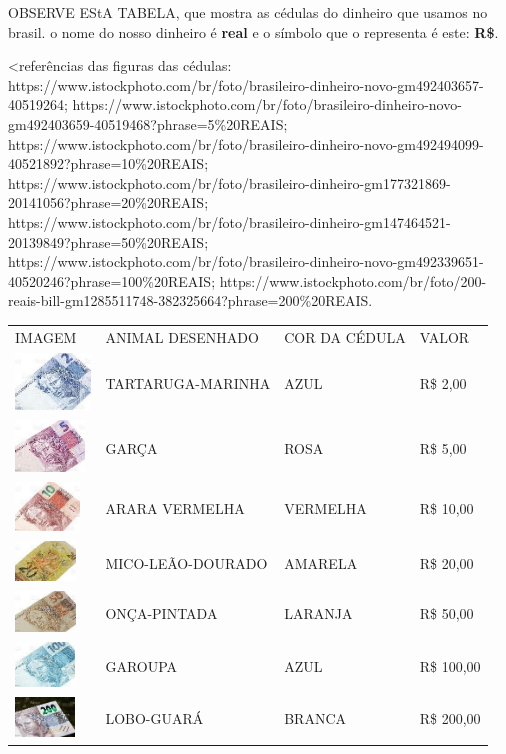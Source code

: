 OBSERVE EStA TABELA, que
mostra as cédulas do dinheiro que usamos no brasil. o nome do nosso
dinheiro é \textbf{real} e o símbolo que o representa é este: \textbf{R\$}.

\textless{}referências das figuras das cédulas:
https://www.istockphoto.com/br/foto/brasileiro-dinheiro-novo-gm492403657-40519264;
https://www.istockphoto.com/br/foto/brasileiro-dinheiro-novo-gm492403659-40519468?phrase=5\%20REAIS;
https://www.istockphoto.com/br/foto/brasileiro-dinheiro-novo-gm492494099-40521892?phrase=10\%20REAIS;
https://www.istockphoto.com/br/foto/brasileiro-dinheiro-gm177321869-20141056?phrase=20\%20REAIS;
https://www.istockphoto.com/br/foto/brasileiro-dinheiro-gm147464521-20139849?phrase=50\%20REAIS;
https://www.istockphoto.com/br/foto/brasileiro-dinheiro-novo-gm492339651-40520246?phrase=100\%20REAIS;
https://www.istockphoto.com/br/foto/200-reais-bill-gm1285511748-382325664?phrase=200\%20REAIS.

\begin{longtable}[]{@{}llll@{}}
\toprule
IMAGEM & ANIMAL DESENHADO & COR DA CÉDULA & VALOR\tabularnewline
\includegraphics[width=0.79592in,height=0.59694in]{media/image47.jpg} &
TARTARUGA-MARINHA & AZUL & R\$ 2,00\tabularnewline
\includegraphics[width=0.73274in,height=0.54956in]{media/image48.jpg} &
GARÇA & ROSA & R\$ 5,00\tabularnewline
\includegraphics[width=0.68163in,height=0.51122in]{media/image49.jpg} &
ARARA VERMELHA & VERMELHA & R\$ 10,00\tabularnewline
\includegraphics[width=0.63139in,height=0.41990in]{media/image50.jpg} &
MICO-LEÃO-DOURADO & AMARELA & R\$ 20,00\tabularnewline
\includegraphics[width=0.63326in,height=0.42114in]{media/image51.jpg} &
ONÇA-PINTADA & LARANJA & R\$ 50,00\tabularnewline
\includegraphics[width=0.62794in,height=0.47095in]{media/image52.jpg} &
GAROUPA & AZUL & R\$ 100,00\tabularnewline
\includegraphics[width=0.63126in,height=0.42104in]{media/image53.jpg} &
LOBO-GUARÁ & BRANCA & R\$ 200,00\tabularnewline
\bottomrule
\end{longtable}

